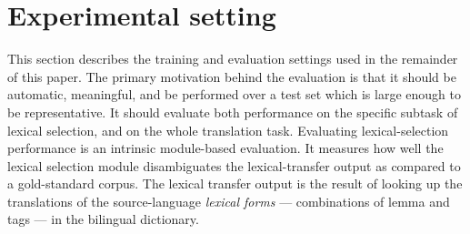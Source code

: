 \documentclass[11pt]{article}
\begin{document}
%   


\section{Experimental setting}

This section describes the training and evaluation settings used in
the remainder of this paper. The primary motivation behind the
evaluation is that it should be automatic, meaningful, and be performed over a test set which
is large enough to be representative. It should evaluate both
performance on the specific subtask of lexical selection, and on the
whole translation task. Evaluating lexical-selection performance is an
intrinsic module-based evaluation.  It measures how well the lexical
selection module disambiguates the lexical-transfer
output as compared to a gold-standard corpus. The lexical 
transfer output is the result of looking up the translations of the 
source-language \emph{lexical forms} --- combinations of lemma and 
tags --- in the bilingual dictionary.
\end{document}
